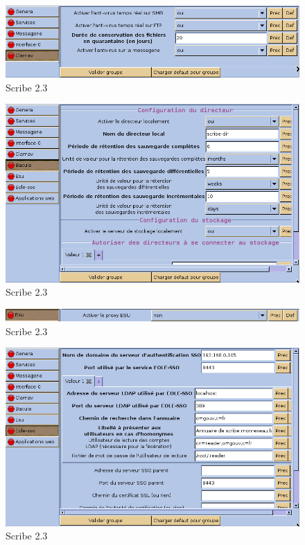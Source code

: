 \documentclass{article}
\makeatletter
\def\maxwidth{\ifdim\Gin@nat@width>\linewidth\linewidth
\else\Gin@nat@width\fi}
\let\Oldincludegraphics\includegraphics
\renewcommand{\includegraphics}[1]{\Oldincludegraphics[width=\maxwidth]{#1}}
\makeatother
\begin{document}
\begin{figure}[htbp]
\centering
\includegraphics{scribe_html_m672d0ca.png}
\caption{Scribe 2.3}
\end{figure}

\begin{figure}[htbp]
\centering
\includegraphics{scribe_html_71d87af7.png}
\caption{Scribe 2.3}
\end{figure}

\begin{figure}[htbp]
\centering
\includegraphics{scribe_html_m51dc1543.png}
\caption{Scribe 2.3}
\end{figure}

\begin{figure}[htbp]
\centering
\includegraphics{scribe_html_28489be3.png}
\caption{Scribe 2.3}
\end{figure}
\end{document}
